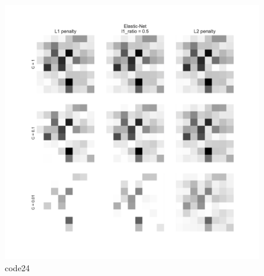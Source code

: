 \begin{PythonCode}\label{例17}
	
\end{PythonCode}

\begin{figure}[htbp]
	\centering
	\includegraphics[width=14cm]{codeimage/code24}
	\caption{code24}
	\label{code24}
\end{figure}

\begin{PythonCode}\label{例18}
	
\end{PythonCode}

\begin{PythonCode}\label{例19}
	
\end{PythonCode}

